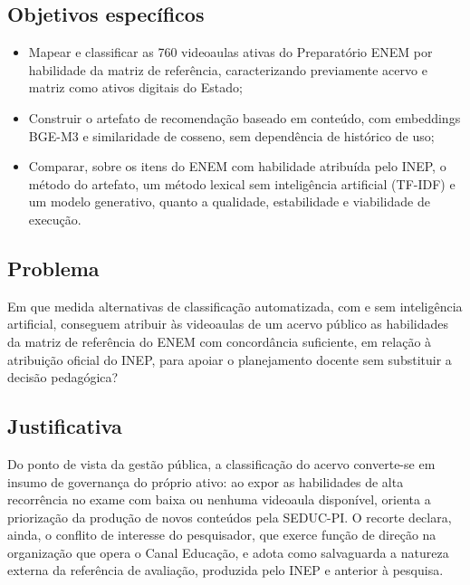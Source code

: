 \subsection{Objetivos específicos}

\begin{itemize}
  \item Mapear e classificar as 760 videoaulas ativas do Preparatório ENEM por
        habilidade da matriz de referência, caracterizando previamente acervo e
        matriz como ativos digitais do Estado;
  \item Construir o artefato de recomendação baseado em conteúdo, com
        embeddings BGE-M3 e similaridade de cosseno, sem dependência de
        histórico de uso;
  \item Comparar, sobre os itens do ENEM com habilidade atribuída pelo INEP, o
        método do artefato, um método lexical sem inteligência artificial
        (TF-IDF) e um modelo generativo, quanto a qualidade, estabilidade e
        viabilidade de execução.
\end{itemize}

\subsection{Problema}

Em que medida alternativas de classificação automatizada, com e sem
inteligência artificial, conseguem atribuir às videoaulas de um acervo público
as habilidades da matriz de referência do ENEM com concordância suficiente, em
relação à atribuição oficial do INEP, para apoiar o planejamento docente sem
substituir a decisão pedagógica?

\subsection{Justificativa}

Do ponto de vista da gestão pública, a classificação do acervo converte-se em
insumo de governança do próprio ativo: ao expor as habilidades de alta
recorrência no exame com baixa ou nenhuma videoaula disponível, orienta a
priorização da produção de novos conteúdos pela SEDUC-PI. O recorte declara,
ainda, o conflito de interesse do pesquisador, que exerce função de direção na
organização que opera o Canal Educação, e adota como salvaguarda a natureza
externa da referência de avaliação, produzida pelo INEP e anterior à pesquisa.
